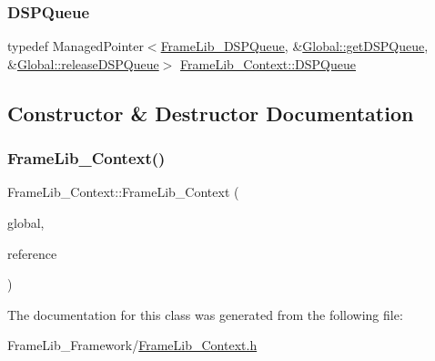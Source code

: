 \subsubsection{\texorpdfstring{D\+S\+P\+Queue}{DSPQueue}}
{\footnotesize\ttfamily typedef Managed\+Pointer$<$\hyperlink{class_frame_lib___d_s_p_queue}{Frame\+Lib\+\_\+\+D\+S\+P\+Queue}, \&\hyperlink{class_frame_lib___global_a5b4e45a675ea406538781011f7ebc153}{Global\+::get\+D\+S\+P\+Queue}, \&\hyperlink{class_frame_lib___global_a118b451294a2893fa60edfb09f60002a}{Global\+::release\+D\+S\+P\+Queue}$>$ \hyperlink{class_frame_lib___context_a1a18438b08e39c370de0e5794029ba77}{Frame\+Lib\+\_\+\+Context\+::\+D\+S\+P\+Queue}}



\subsection{Constructor \& Destructor Documentation}
\mbox{\label{class_frame_lib___context_a2cfe1912e3e9d835de291277c8979ed8}} 
\subsubsection{\texorpdfstring{Frame\+Lib\+\_\+\+Context()}{FrameLib\_Context()}}
{\footnotesize\ttfamily Frame\+Lib\+\_\+\+Context\+::\+Frame\+Lib\+\_\+\+Context (\begin{DoxyParamCaption}\item[{\hyperlink{class_frame_lib___global}{Frame\+Lib\+\_\+\+Global} $\ast$}]{global,  }\item[{void $\ast$}]{reference }\end{DoxyParamCaption})\hspace{0.3cm}{\ttfamily [inline]}}



The documentation for this class was generated from the following file\+:\begin{DoxyCompactItemize}
\item 
Frame\+Lib\+\_\+\+Framework/\hyperlink{_frame_lib___context_8h}{Frame\+Lib\+\_\+\+Context.\+h}\end{DoxyCompactItemize}
